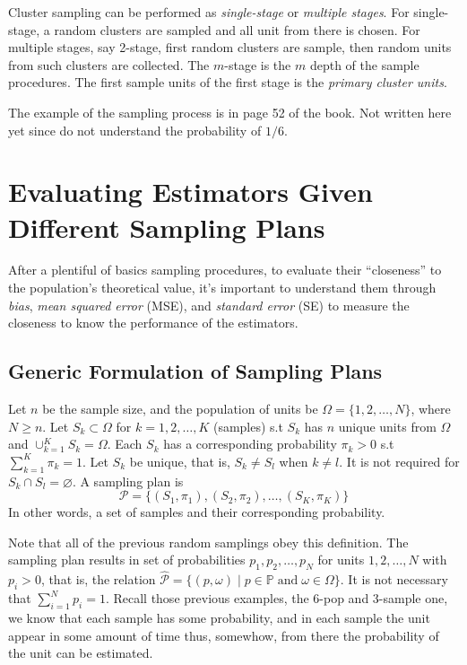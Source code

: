 Cluster sampling can be performed as \emph{single-stage} or \emph{multiple stages}. For single-stage, a random clusters are sampled and all unit from there is chosen. For multiple stages, say 2-stage, first random clusters
are sample, then random units from such clusters are collected. The $m$-stage is the $m$ depth of the sample procedures. The first sample units of the first stage is the \emph{primary cluster units}.

The example of the sampling process is in page 52 of the book. Not written here yet since do not understand the probability of $1/6$.

\section{Evaluating Estimators Given Different Sampling Plans}
After a plentiful of basics sampling procedures, to evaluate their ``closeness'' to the population's theoretical value, it's important to understand them through \emph{bias}, \emph{mean squared error} (MSE), and 
\emph{standard error} (SE) to measure the closeness to know the performance of the estimators.

\subsection{Generic Formulation of Sampling Plans}
\label{sec:GenericFormulationofSamplingPlans}
\begin{definitionbox}
    Let $n$ be the sample size, and the population of units be $\Omega=\{1,2,\ldots,N\}$, where $N\geq n$. Let $S_k\subset\Omega$ for $k=1,2,\ldots,K$ (samples) s.t $S_k$ has $n$ unique units from $\Omega$ and 
    $\cup_{k=1}^{K}S_k=\Omega$. Each $S_k$ has a corresponding probability $\pi_k>0$ s.t $\sum^{K}_{k=1}\pi_k=1$. Let $S_k$ be unique, that is, $S_k\neq S_l$ when $k\neq l$. It is not required for $S_k\cap S_l=\varnothing$.
    A sampling plan is
    \begin{equation}
        \mathcal{P}=\{(S_1,\pi_1),(S_2,\pi_2),\ldots,(S_K,\pi_K)\}
    \end{equation}
    In other words, a set of samples and their corresponding probability.
\end{definitionbox}
Note that all of the previous random samplings obey this definition. The sampling plan results in set of probabilities $p_1,p_2,\ldots,p_N$ for units $1,2,\ldots,N$ with $p_i>0$, that is, the relation 
$\hat{\mathcal{P}}=\{(p,\omega)\mid p\in\mathbb{P}\;\mathrm{and}\;\omega\in\Omega\}$. It is not necessary that $\sum_{i=1}^{N}p_i=1$.
Recall those previous examples, the 6-pop and 3-sample one, we know that each sample has some probability, and in each sample the unit
appear in some amount of time thus, somewhow, from there the probability of the unit can be estimated. 

